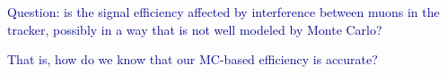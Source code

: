 \documentclass[compress]{beamer}
\begin{document}
\begin{frame}
\vfill

\textcolor{darkblue}{\large Question: is the signal efficiency affected by interference between muons in the tracker, possibly in a way that is not well modeled by Monte Carlo?}

\vfill
\textcolor{darkblue}{\large That is, how do we know that our MC-based efficiency is accurate?}

\vfill
\end{frame}




\end{document}

